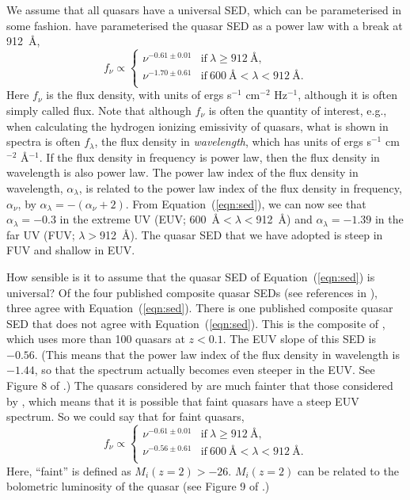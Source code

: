 \documentclass[a4paper,fleqn,usenatbib]{mnras}
\begin{document}
We assume that all quasars have a universal SED, which can be
parameterised in some fashion.  \citet{2015MNRAS.449.4204L} have
parameterised the quasar SED as a power law with a break at 912~{\AA},
\begin{equation}
f_\nu\propto\begin{cases}
               \nu^{-0.61\pm 0.01} & \text{if}~\lambda\geq 912~\text{\AA},\\
               \nu^{-1.70\pm 0.61} & \text{if}~600~\text{\AA}<\lambda<912~\text{\AA}.\\                
               \end{cases}
\label{eqn:sed}
\end{equation}
Here $f_\nu$ is the flux density, with units of ergs s$^{-1}$
cm$^{-2}$ Hz$^{-1}$, although it is often simply called flux.  Note
that although $f_\nu$ is often the quantity of interest, e.g., when
calculating the hydrogen ionizing emissivity of quasars, what is shown
in spectra is often $f_\lambda$, the flux density
in \emph{wavelength}, which has units of ergs s$^{-1}$
cm$^{-2}$ \AA$^{-1}$.  If the flux density in frequency is power law,
then the flux density in wavelength is also power law.  The power law
index of the flux density in wavelength, $\alpha_\lambda$, is related
to the power law index of the flux density in frequency, $\alpha_\nu$,
by $\alpha_\lambda=-(\alpha_\nu+2)$.  From Equation~(\ref{eqn:sed}),
we can now see that $\alpha_\lambda=-0.3$ in the extreme UV (EUV;
600~{\AA}$<\lambda<$912~{\AA}) and $\alpha_\lambda=-1.39$ in the far
UV (FUV; $\lambda>$912~{\AA}).  The quasar SED that we have adopted is
steep in FUV and shallow in EUV.

How sensible is it to assume that the quasar SED of
Equation~(\ref{eqn:sed}) is universal?  Of the four published
composite quasar SEDs (see references in
\citealt{2015MNRAS.449.4204L}), three agree with
Equation~(\ref{eqn:sed}).  There is one published composite quasar SED
that does not agree with Equation~(\ref{eqn:sed}).  This is the
composite of \citet{2004ApJ...615..135S}, which uses more than 100
quasars at $z<0.1$.  The EUV slope of this SED is $-0.56$.  (This
means that the power law index of the flux density in wavelength is
$-1.44$, so that the spectrum actually becomes even steeper in the
EUV.  See Figure 8 of \citealt{2015MNRAS.449.4204L}.)  The quasars
considered by \citet{2004ApJ...615..135S} are much fainter that those
considered by \citet{2015MNRAS.449.4204L}, which means that it is
possible that faint quasars have a steep EUV spectrum.  So we could
say that for faint quasars,
\begin{equation}
f_\nu\propto\begin{cases}
               \nu^{-0.61\pm 0.01} & \text{if}~\lambda\geq 912~\text{\AA},\\
               \nu^{-0.56\pm 0.61} & \text{if}~600~\text{\AA}<\lambda<912~\text{\AA}.\\                
               \end{cases}
\label{eqn:sed_faint}
\end{equation}
Here, ``faint'' is defined as $M_i(z=2)>-26$.  $M_i(z=2)$ can be
related to the bolometric luminosity of the quasar (see Figure 9 of
\citealt{2015MNRAS.449.4204L}.)
\end{document}
